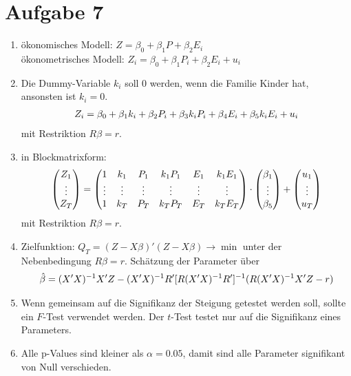 \documentclass{article}
\begin{document}
	\section*{Aufgabe 7}
	\begin{enumerate}[label=(\alph*)]
		\item ökonomisches Modell: $Z = \beta_0 + \beta_1 P + \beta_2E_i$ \\
		ökonometrisches Modell: $Z_i = \beta_0 + \beta_1P_i + \beta_2E_i + u_i$
		\item Die Dummy-Variable $k_i$ soll 0 werden, wenn die Familie Kinder hat, ansonsten ist $k_i=0$.
		\begin{align}
			Z_i = \beta_0 + \beta_1 k_i + \beta_2P_i + \beta_3k_iP_i + \beta_4E_i + \beta_5k_iE_i + u_i \notag
		\end{align}
		mit Restriktion $R\beta=r$.
		\item in Blockmatrixform:
		\begin{align}
			\begin{pmatrix}
				Z_1 \\ \vdots \\ Z_T
			\end{pmatrix} = \begin{pmatrix}
				1 & k_1 & P_1 & k_1P_1 & E_1 & k_1E_1 \\
				\vdots & \vdots & \vdots & \vdots & \vdots & \vdots \\
				1 & k_T & P_T & k_TP_T & E_T & k_TE_T
			\end{pmatrix}\cdot\begin{pmatrix}
				\beta_1 \\ \vdots \\ \beta_5
			\end{pmatrix} + \begin{pmatrix}
				u_1 \\ \vdots \\ u_T
			\end{pmatrix} \notag
		\end{align}
		mit Restriktion $R\beta=r$.
		\item Zielfunktion: $Q_T=(Z - X\beta)'(Z-X\beta)\to\min$ unter der Nebenbedingung $R\beta=r$. Schätzung der Parameter über
		\begin{align}
			\hat{\beta} = (X'X)^{-1}X'Z - (X'X)^{-1}R'[R(X'X)^{-1}R']^{-1}(R(X'X)^{-1}X'Z-r) \notag
		\end{align}
		\item Wenn gemeinsam auf die Signifikanz der Steigung getestet werden soll, sollte ein $F$-Test verwendet werden. Der $t$-Test testet nur auf die Signifikanz eines Parameters.
		\item Alle p-Values sind kleiner als $\alpha=0.05$, damit sind alle Parameter signifikant von Null verschieden.
	\end{enumerate}
	
\end{document}
